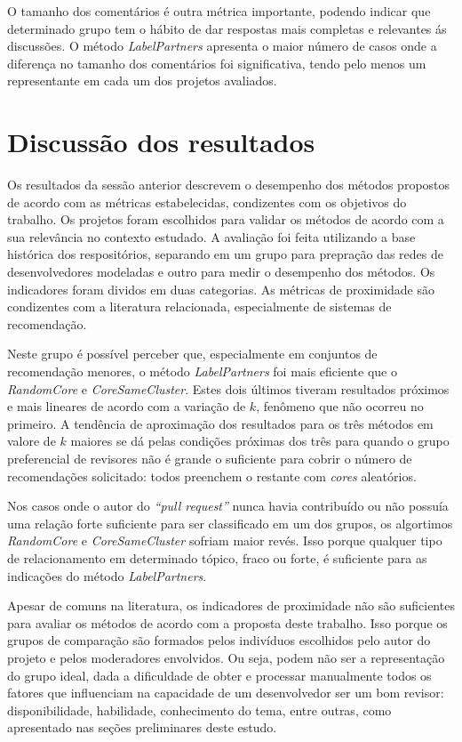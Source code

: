 \documentclass[12pt,openany,oneside,a4paper,english,brazil]{abntbibufjf}
\begin{document}
O tamanho dos comentários é outra métrica importante, podendo indicar que determinado grupo tem o hábito de dar respostas mais completas e relevantes ás discussões. O método \textit{LabelPartners} apresenta o maior número de casos onde a diferença no tamanho dos comentários foi significativa, tendo pelo menos um representante em cada um dos projetos avaliados.

\section{Discussão dos resultados}\label{sec:discussao}

Os resultados da sessão anterior descrevem o desempenho dos métodos propostos de acordo com as métricas estabelecidas, condizentes com os objetivos do trabalho. Os projetos foram escolhidos para validar os métodos de acordo com a sua relevância no contexto estudado. A avaliação foi feita utilizando a base histórica dos respositórios, separando em um grupo para prepração das redes de desenvolvedores modeladas e outro para medir o desempenho dos métodos. Os indicadores foram dividos em duas categorias. As métricas de proximidade são condizentes com a literatura relacionada, especialmente de sistemas de recomendação.

Neste grupo é possível perceber que, especialmente em conjuntos de recomendação menores, o método \textit{LabelPartners} foi mais eficiente que o \textit{RandomCore} e \textit{CoreSameCluster}. Estes dois últimos tiveram resultados próximos e mais lineares de acordo com a variação de $k$, fenômeno que não ocorreu no primeiro. A tendência de aproximação dos resultados para os três métodos em valore de $k$ maiores se dá pelas condições próximas dos três para quando o grupo preferencial de revisores não é grande o suficiente para cobrir o número de recomendações solicitado: todos preenchem o restante com \textit{cores} aleatórios.

Nos casos onde o autor do \textit{``pull request''} nunca havia contribuído ou não possuía uma relação forte suficiente para ser classificado em um dos grupos, os algortimos \textit{RandomCore} e \textit{CoreSameCluster} sofriam maior revés. Isso porque qualquer tipo de relacionamento em determinado tópico, fraco ou forte, é suficiente para as indicações do método \textit{LabelPartners}.

Apesar de comuns na literatura, os indicadores de proximidade não são suficientes para avaliar os métodos de acordo com a proposta deste trabalho. Isso porque os grupos de comparação são formados pelos indivíduos escolhidos pelo autor do projeto e pelos moderadores envolvidos. Ou seja, podem não ser a representação do grupo ideal, dada a dificuldade de obter e processar manualmente todos os fatores que influenciam na capacidade de um desenvolvedor ser um bom revisor: disponibilidade, habilidade, conhecimento do tema, entre outras, como apresentado nas seções preliminares deste estudo.
\end{document}
